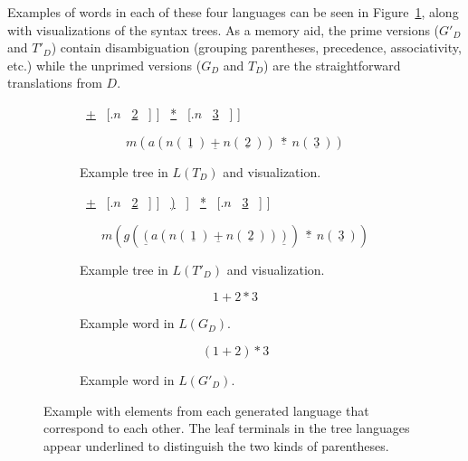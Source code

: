\documentclass[acmsmall,review,anonymous]{acmart}\settopmatter{printfolios=true,printccs=false,printacmref=false}
\begin{document}
\noindent Examples of words in each of these four languages can be seen in Figure~\ref{fig:example-words-in-square}, along with visualizations of the syntax trees. As a memory aid, the prime versions ($G'_D$ and $T'_D$) contain disambiguation (grouping parentheses, precedence, associativity, etc.) while the unprimed versions ($G_D$ and $T_D$) are the straightforward translations from $D$.

{
\newcommand{\terminal}[1]{\ \underline{#1}\ }

\begin{figure}
  \begin{subfigure}[b]{.45\linewidth}
    \begin{center}
    \Tree [.{$m$}
        [.{$a$}
          [.{$n$} \terminal{1} ]
          \terminal{+}
          [.{$n$} \terminal{2} ] ]
        \terminal{*}
        [.{$n$} \terminal{3} ] ]
    \end{center}
    \[m(a(n(\terminal{1}) \terminal{+} n(\terminal{2})) \terminal{*} n(\terminal{3}))\]
    \caption{Example tree in $L(T_D)$ and visualization.}
  \end{subfigure}
  \begin{subfigure}[b]{.45\linewidth}
    \begin{center}
    \Tree [.{$m$}
        [.{$g$}
          \terminal{(}
          [.{$a$}
            [.{$n$} \terminal{1} ]
            \terminal{+}
            [.{$n$} \terminal{2} ] ]
          \terminal{)} ]
        \terminal{*}
        [.{$n$} \terminal{3} ] ]
    \end{center}
    \[m(g( \terminal{(} a(n( \terminal{1} ) \terminal{+} n( \terminal{2} )) \terminal{)} ) \terminal{*} n( \terminal{3} ))\]
    \caption{Example tree in $L(T'_D)$ and visualization.}
  \end{subfigure}

  \begin{subfigure}[b]{.40\linewidth}
    \[1 + 2 * 3\]
    \caption{Example word in $L(G_D)$.}
  \end{subfigure}
  \begin{subfigure}[b]{.40\linewidth}
    \[(1 + 2) * 3\]
    \caption{Example word in $L(G'_D)$.}
  \end{subfigure}
  \caption{Example with elements from each generated language that correspond to each other. The leaf terminals in the tree languages appear underlined to distinguish the two kinds of parentheses.}
  \label{fig:example-words-in-square}
\end{figure}
}
\end{document}
